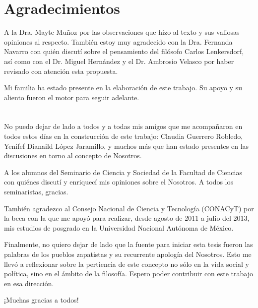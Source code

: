 \documentclass[oneside]{book}
\begin{document}
\chapter*{Agradecimientos}


A la Dra. Mayte Muñoz por las observaciones que hizo al texto y sus valiosas opiniones al respecto. También estoy muy agradecido con la Dra. Fernanda Navarro con quién discutí sobre el pensamiento del filósofo Carlos Lenkersdorf, así como con el Dr. Miguel Hernández y el Dr. Ambrosio Velasco por haber revisado con atención esta propuesta.

        Mi familia ha estado presente en la elaboración de este trabajo. Su apoyo y su aliento fueron el motor para seguir adelante.
\\
\\
\\

        No puedo dejar de lado a todos y a todas mis amigos que me acompañaron en todos estos días en la construcción de este trabajo: Claudia Guerrero Robledo, Yenifef Dianaild López Jaramillo, y muchos más que han estado presentes en las discusiones en torno al concepto de Nosotros.

        A los alumnos del Seminario de Ciencia y Sociedad de la Facultad de Ciencias con quiénes discutí y enriquecí mis opiniones sobre el Nosotros. A todos los seminaristas, gracias.

        También agradezco al Consejo Nacional de Ciencia y Tecnología (CONACyT) por la beca con la que me apoyó para realizar, desde agosto de 2011 a julio del 2013, mis estudios de posgrado en la Universidad Nacional Autónoma de México. 

        Finalmente, no quiero dejar de lado que la fuente para iniciar esta tesis fueron las palabras de los pueblos zapatistas y su recurrente apología del Nosotros. Esto me llevó a reflexionar sobre la pertiencia de este concepto no sólo en la vida social y política, sino en el ámbito de la filosofía. Espero poder contribuir con este trabajo en esa dirección. 
    
¡Muchas gracias a todos!
\pagestyle{fancy}
\fancyhf{}
\lhead[\textit{\small{\rightmark}}]{\textit{\small{\rightmark}}}
\rhead[\thepage]{\thepage}
\end{document}
